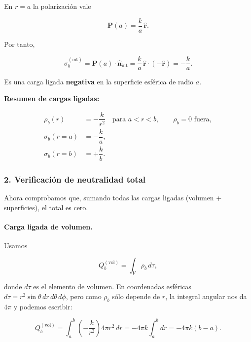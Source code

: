 \documentclass{article}
\begin{document}
En $r=a$ la polarización vale

\begin{equation}
\mathbf{P}(a) = \frac{k}{a}\,\hat{\mathbf{r}}.
\label{eq:P-a}
\end{equation}

Por tanto,

\begin{equation}
\sigma_{b}^{(\text{int})}
= \mathbf{P}(a)\cdot\hat{\mathbf{n}}_{\text{int}}
= \frac{k}{a}\,\hat{\mathbf{r}}\cdot(-\hat{\mathbf{r}})
= -\frac{k}{a}.
\label{eq:sigma-int}
\end{equation}

Es una carga ligada \textbf{negativa} en la superficie esférica de radio $a$.

\medskip

\textbf{Resumen de cargas ligadas:}

\begin{align}
\rho_{b}(r) &= -\dfrac{k}{r^{2}} \quad \text{para } a<r<b,
\qquad \rho_{b}=0 \text{ fuera},
\\[4pt]
\sigma_{b}(r=a) &= -\dfrac{k}{a},
\\[4pt]
\sigma_{b}(r=b) &= +\dfrac{k}{b}.
\end{align}

\subsubsection*{2. Verificación de neutralidad total}

Ahora comprobamos que, sumando todas las cargas ligadas (volumen + superficies),
el total es cero.

\paragraph{Carga ligada de volumen.}

Usamos

\[
Q_{b}^{(\text{vol})} = \int_{V} \rho_{b}\,d\tau,
\]

donde $d\tau$ es el elemento de volumen. En coordenadas esféricas  
$d\tau = r^{2}\sin\theta\,dr\,d\theta\,d\phi$, pero como $\rho_{b}$ sólo depende
de $r$, la integral angular nos da $4\pi$ y podemos escribir:

\begin{equation}
Q_{b}^{(\text{vol})}
= \int_{a}^{b}\left(-\frac{k}{r^{2}}\right)4\pi r^{2}\,dr
= -4\pi k\int_{a}^{b}dr
= -4\pi k(b-a).
\label{eq:Qb-vol-shell}
\end{equation}
\end{document}
